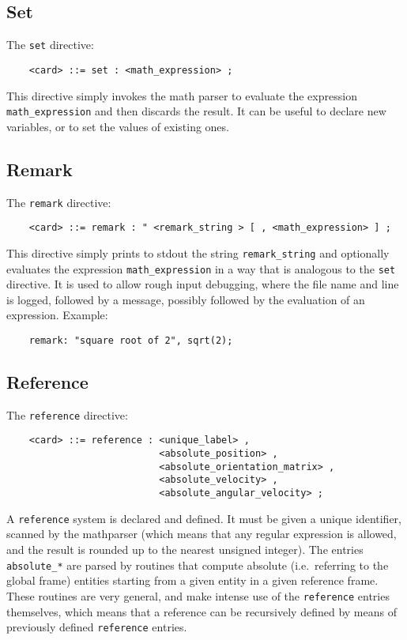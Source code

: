 \subsection{Set}
The \texttt{set} directive:
\begin{verbatim}
    <card> ::= set : <math_expression> ;
\end{verbatim}
This directive simply invokes the math parser to evaluate the expression
\texttt{math\_expression} and then discards the result. It can be useful
to declare new variables, or to set the values of existing ones.

\subsection{Remark}
The \texttt{remark} directive:
\begin{verbatim}
    <card> ::= remark : " <remark_string > [ , <math_expression> ] ;
\end{verbatim}
This directive simply prints to stdout the string \texttt{remark\_string} and
optionally evaluates the expression \texttt{math\_expression} in a way that is
analogous to the \texttt{set} directive.
It is used to allow rough input debugging, where the file name and line 
is logged, followed by a message, possibly followed by the evaluation 
of an expression. 
Example:
\begin{verbatim}
    remark: "square root of 2", sqrt(2);
\end{verbatim}

\subsection{Reference}
The \texttt{reference} directive:
\begin{verbatim}
    <card> ::= reference : <unique_label> , 
                           <absolute_position> ,
                           <absolute_orientation_matrix> ,
                           <absolute_velocity> ,
                           <absolute_angular_velocity> ;
\end{verbatim}
A \texttt{reference} system is declared and defined.
It must be given a unique identifier, scanned by the mathparser
(which means that any regular expression is allowed, and the result is
rounded up to the nearest unsigned integer).
The entries \texttt{absolute\_*} are parsed by routines that
compute absolute (i.e.\ referring to the global frame) entities
starting from a given entity in a given reference frame.
These routines are very general, and make intense use of the 
\texttt{reference} entries themselves, which means that a reference 
can be recursively defined by means of previously defined 
\texttt{reference} entries.


